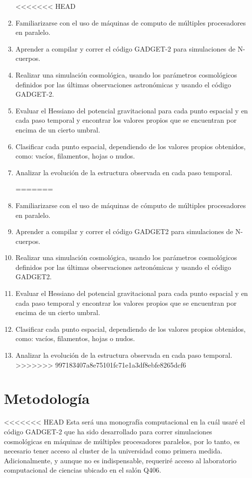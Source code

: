 \documentclass{article}
\begin{document}
\begin{enumerate}

<<<<<<< HEAD
\item Familiarizarse con el uso de máquinas de computo de múltiples procesadores en paralelo. 
\item Aprender a compilar y correr el código GADGET-2 para simulaciones de N-cuerpos.
\item Realizar una simulación cosmológica, usando los parámetros cosmológicos definidos por las últimas observaciones astronómicas y usando el código GADGET-2.
\item Evaluar el Hessiano del potencial gravitacional para cada punto espacial y en cada paso temporal y encontrar los valores propios que se encuentran por encima de un cierto umbral.
\item Clasificar cada punto espacial, dependiendo de los valores propios obtenidos, como: vacíos, filamentos, hojas o nudos.
\item Analizar la evolución de la estructura observada en cada paso temporal.

=======
\item Familiarizarse con el uso de máquinas de c\'omputo de múltiples
  procesadores en paralelo.  
\item Aprender a compilar y correr el código GADGET2 para simulaciones
  de N-cuerpos. 
\item Realizar una simulación cosmológica, usando los parámetros
  cosmológicos definidos por las últimas observaciones astronómicas y
  usando el código GADGET2. 
\item Evaluar el Hessiano del potencial gravitacional para cada punto
  espacial y en cada paso temporal y encontrar los valores propios que
  se encuentran por encima de un cierto umbral. 
\item Clasificar cada punto espacial, dependiendo de los valores
  propios obtenidos, como: vacíos, filamentos, hojas o nudos. 
\item Analizar la evolución de la estructura observada en cada paso
  temporal. 
>>>>>>> 997183407a8e75101fc71e1a3df8ebfe8265dcf6
\end{enumerate}


\section{Metodología}

<<<<<<< HEAD
Esta será una monografía computacional en la cuál usaré el código GADGET-2 que ha sido desarrollado  para correr simulaciones cosmológicas en máquinas de múltiples procesadores paralelos, por lo tanto, es necesario tener acceso al cluster de la universidad como primera medida. Adicionalmente, y aunque no es indispensable, requeriré acceso al laboratorio computacional de ciencias ubicado en el salón Q406.
\end{document}
